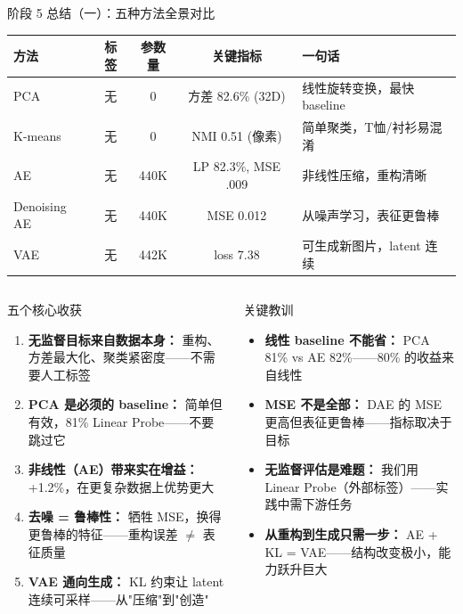 \documentclass[aspectratio=169]{ctexbeamer}
\begin{document}
\begin{frame}[shrink=20]{阶段 5 总结（一）：五种方法全景对比}
\small

\begin{center}
\begin{tabular}{l c c c l}
\toprule
\textbf{方法} & \textbf{标签} & \textbf{参数量} & \textbf{关键指标} & \textbf{一句话} \\
\midrule
PCA          & 无 & 0      & 方差 82.6\% (32D)  & 线性旋转变换，最快 baseline \\
K-means      & 无 & 0      & NMI 0.51 (像素)    & 简单聚类，T恤/衬衫易混淆 \\
AE           & 无 & 440K  & LP 82.3\%, MSE .009 & 非线性压缩，重构清晰 \\
Denoising AE & 无 & 440K  & MSE 0.012          & 从噪声学习，表征更鲁棒 \\
VAE          & 无 & 442K  & loss 7.38          & 可生成新图片，latent 连续 \\
\bottomrule
\end{tabular}
\end{center}

\vspace{0.15cm}

\begin{columns}[T]
\begin{block}{五个核心收获}
\footnotesize
\begin{enumerate}
  \item \textbf{无监督目标来自数据本身：} 重构、方差最大化、聚类紧密度——不需要人工标签
  \item \textbf{PCA 是必须的 baseline：} 简单但有效，81\% Linear Probe——不要跳过它
  \item \textbf{非线性（AE）带来实在增益：} +1.2\%，在更复杂数据上优势更大
  \item \textbf{去噪 = 鲁棒性：} 牺牲 MSE，换得更鲁棒的特征——重构误差 $\neq$ 表征质量
  \item \textbf{VAE 通向生成：} KL 约束让 latent 连续可采样——从"压缩"到"创造"
\end{enumerate}
\end{block}

\begin{block}{关键教训}
\footnotesize
\begin{itemize}
  \item \textbf{线性 baseline 不能省：} PCA 81\% vs AE 82\%——80\% 的收益来自线性
  \item \textbf{MSE 不是全部：} DAE 的 MSE 更高但表征更鲁棒——指标取决于目标
  \item \textbf{无监督评估是难题：} 我们用 Linear Probe（外部标签）——实践中需下游任务
  \item \textbf{从重构到生成只需一步：} AE + KL = VAE——结构改变极小，能力跃升巨大
\end{itemize}
\end{block}
\end{columns}
\end{frame}
\end{document}
